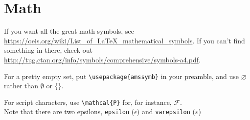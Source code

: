 \section{Math}\label{sec:math-symbols}
If you want all the great math symbols, see \url{https://oeis.org/wiki/List_of_LaTeX_mathematical_symbols}. If you can't find something in there, check out \url{http://tug.ctan.org/info/symbols/comprehensive/symbols-a4.pdf}.

For a pretty empty set, put \verb+\usepackage{amssymb}+ in your preamble, and use $\varnothing$ rather than $\emptyset$ or $\{\}$.


For script characters, use \verb+\mathcal{P}+ for, for instance, $\mathcal{F}$. \\

Note that there are two epsilons, \verb+epsilon+ ($\epsilon$) and \verb+varepsilon+ ($\varepsilon$)

